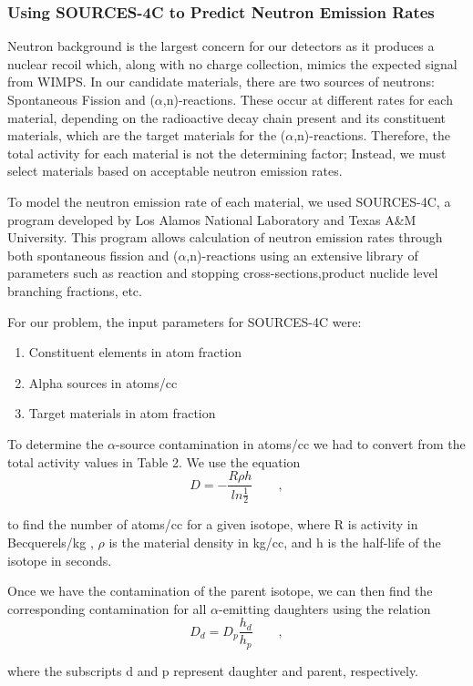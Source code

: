 \documentclass{report}
\begin{document}
\subsubsection{Using SOURCES-4C to Predict Neutron Emission Rates}
Neutron background is the largest concern for our detectors as it produces a
nuclear recoil which, along with no charge collection, mimics the expected signal
from WIMPS. In our candidate materials, there are two sources of neutrons:
Spontaneous Fission and ($\alpha$,n)-reactions. These occur at different rates
for each material, depending on the radioactive decay chain present and its
constituent materials, which are the target materials for the ($\alpha$,n)-reactions.
Therefore, the total activity for each material is not the determining factor;
Instead, we must select materials based on acceptable neutron emission rates.

To model the neutron emission rate of each material, we used SOURCES-4C, a program
developed by Los Alamos National Laboratory and Texas A\&M University. This
program allows calculation of neutron emission rates through both spontaneous
fission and ($\alpha$,n)-reactions using an extensive library of parameters
such as reaction and stopping cross-sections,product nuclide level branching
fractions, etc.

For our problem, the input parameters for SOURCES-4C were:
\begin{enumerate}
\item Constituent elements in atom fraction
\item Alpha sources in atoms/cc
\item Target materials in atom fraction
\end{enumerate}

To determine the $\alpha$-source contamination in atoms/cc we had to convert
from the total activity values in Table 2. We use the equation
$$
D = -\frac{R \rho h}{ln\frac{1}{2}} \qquad,
$$

to find the number of atoms/cc for a given isotope, where R is activity in
Becquerels/kg , $\rho$ is the material density in kg/cc, and h is the half-life
of the isotope in seconds.

Once we have the contamination of the parent isotope, we can then find the
corresponding contamination for all $\alpha$-emitting daughters using the relation
$$
D_{d} = D_{p}\frac{h_{d}}{h_{p}} \qquad,
$$

where the subscripts d and p represent daughter and parent, respectively.
\end{document}
